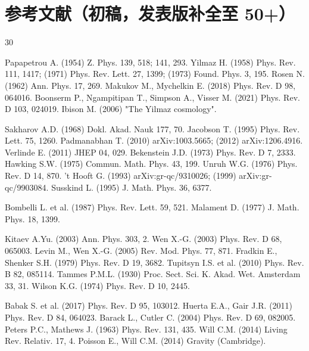 \documentclass[12pt]{article}
\begin{document}
\section*{参考文献（初稿，发表版补全至 50+）}
\begin{thebibliography}{30}

 Papapetrou A. (1954) Z. Phys. 139, 518; 141, 293. 
 Yilmaz H. (1958) Phys. Rev. 111, 1417; (1971) Phys. Rev. Lett. 27, 1399; (1973) Found. Phys. 3, 195. 
 Rosen N. (1962) Ann. Phys. 17, 269. 
 Makukov M., Mychelkin E. (2018) Phys. Rev. D 98, 064016. 
 Boonserm P., Ngampitipan T., Simpson A., Visser M. (2021) Phys. Rev. D 103, 024019. 
 Ibison M. (2006) "The Yilmaz cosmology".

 Sakharov A.D. (1968) Dokl. Akad. Nauk 177, 70. 
 Jacobson T. (1995) Phys. Rev. Lett. 75, 1260. 
 Padmanabhan T. (2010) arXiv:1003.5665; (2012) arXiv:1206.4916. 
 Verlinde E. (2011) JHEP 04, 029. 
 Bekenstein J.D. (1973) Phys. Rev. D 7, 2333. 
 Hawking S.W. (1975) Commun. Math. Phys. 43, 199. 
 Unruh W.G. (1976) Phys. Rev. D 14, 870. 
 't Hooft G. (1993) arXiv:gr-qc/9310026; (1999) arXiv:gr-qc/9903084. 
 Susskind L. (1995) J. Math. Phys. 36, 6377.

 Bombelli L. et al. (1987) Phys. Rev. Lett. 59, 521. 
 Malament D. (1977) J. Math. Phys. 18, 1399.

 Kitaev A.Yu. (2003) Ann. Phys. 303, 2. 
 Wen X.-G. (2003) Phys. Rev. D 68, 065003. 
 Levin M., Wen X.-G. (2005) Rev. Mod. Phys. 77, 871. 
 Fradkin E., Shenker S.H. (1979) Phys. Rev. D 19, 3682. 
 Tupitsyn I.S. et al. (2010) Phys. Rev. B 82, 085114. 
 Tammes P.M.L. (1930) Proc. Sect. Sci. K. Akad. Wet. Amsterdam 33, 31. 
 Wilson K.G. (1974) Phys. Rev. D 10, 2445.

 Babak S. et al. (2017) Phys. Rev. D 95, 103012. 
 Huerta E.A., Gair J.R. (2011) Phys. Rev. D 84, 064023. 
 Barack L., Cutler C. (2004) Phys. Rev. D 69, 082005. 
 Peters P.C., Mathews J. (1963) Phys. Rev. 131, 435. 
 Will C.M. (2014) Living Rev. Relativ. 17, 4. 
 Poisson E., Will C.M. (2014) Gravity (Cambridge).



\end{thebibliography}
\end{document}
